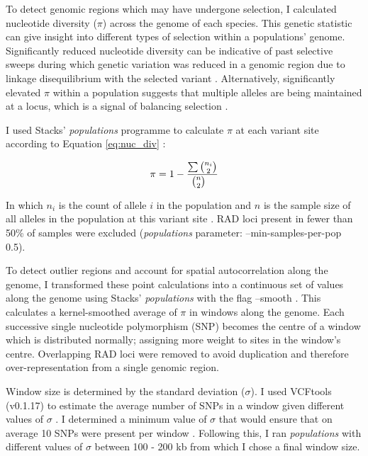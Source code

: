 \documentclass[12pt]{article}
\begin{document}
\begin{linenumbers}
		To detect genomic regions which may have undergone selection, I calculated nucleotide diversity ($\pi$) across the genome of each species. This genetic statistic can give insight into different types of selection within a populations' genome. Significantly reduced nucleotide diversity can be indicative of past selective sweeps during which genetic variation was reduced in a genomic region due to linkage disequilibrium with the selected variant \citep{hohenlohe_population_2012, mollion_patterns_2017, pracana_fire_2017}. Alternatively, significantly elevated $\pi$ within a population suggests that multiple alleles are being maintained at a locus, which is a signal of balancing selection \citep{davey_radseq_2010, hohenlohe_using_2010}.
		
		I used Stacks' \emph{populations} programme to calculate $\pi$ at each variant site according to Equation \ref{eq:nuc_div} \citep{catchen_stacks_2013}:
		
		\begin{equation}
			\pi = 1 - \frac{\sum{n_i \choose 2} \\~\\}{{n \choose 2} \\~\\}
			\label{eq:nuc_div}
		\end{equation}
		
		In which $n_i$ is the count of allele $i$ in the population and $n$ is the sample size of all alleles in the population at this variant site \citep{hohenlohe_population_2010}. RAD loci present in fewer than 50\% of samples were excluded (\emph{populations} parameter: --min-samples-per-pop 0.5). 
		
		To detect outlier regions and account for spatial autocorrelation along the genome, I transformed these point calculations into a continuous set of values along the genome using Stacks' \emph{populations} with the flag --smooth \citep{catchen_stacks_2013}.
		This calculates a kernel-smoothed average of $\pi$ in windows along the genome. Each successive single nucleotide polymorphism (SNP) becomes the centre of a window which is distributed normally; assigning more weight to sites in the window's centre. Overlapping RAD loci were removed to avoid duplication and therefore over-representation from a single genomic region. 
		
		Window size is determined by the standard deviation ($\sigma$). I used VCFtools (v0.1.17) to estimate the average number of SNPs in a window given different values of $\sigma$ \citep{danecek_variant_2011}. I determined a minimum value of $\sigma$ that would ensure that on average 10 SNPs were present per window \citep{buckley_restriction_2018}. Following this, I ran \emph{populations} with different values of $\sigma$ between 100 - 200 kb from which I chose a final window size. 
		

\end{linenumbers}
\end{document}
